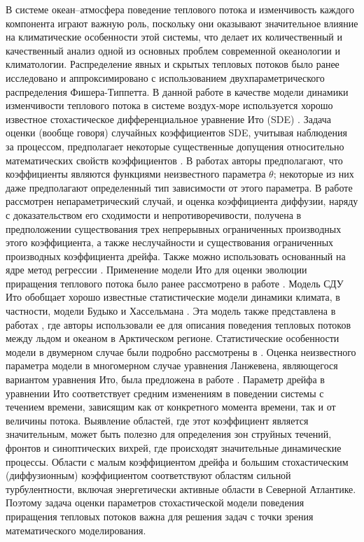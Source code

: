 В системе океан–атмосфера поведение теплового потока и изменчивость каждого компонента играют важную роль, поскольку они оказывают значительное влияние \cite{perry1977ocean} на климатические особенности этой системы, что делает их количественный и качественный анализ одной из основных проблем современной океанологии и климатологии. Распределение явных и скрытых тепловых потоков было ранее исследовано и аппроксимировано с использованием двухпараметрического распределения Фишера-Типпетта.
В данной работе в качестве модели динамики изменчивости теплового потока в системе воздух-море используется хорошо известное стохастическое дифференциальное уравнение Ито (SDE) \cite{Pascucci2022}. Задача оценки (вообще говоря) случайных коэффициентов SDE, учитывая наблюдения за процессом, предполагает некоторые существенные допущения относительно математических свойств коэффициентов \cite{Yoshida1992, GenonCatalot1993, GenonCatalot1994, Wei2016}. В работах \cite{Yoshida1992, GenonCatalot1993, GenonCatalot1994, Wei2016} авторы предполагают, что коэффициенты являются функциями неизвестного параметра $\theta$; некоторые из них даже предполагают определенный тип зависимости от этого параметра. В работе \cite{FlorensZmirou1993} рассмотрен непараметрический случай, и оценка коэффициента диффузии, наряду с доказательством его сходимости и непротиворечивости, получена в предположении существования трех непрерывных ограниченных производных этого коэффициента, а также неслучайности и существования ограниченных производных коэффициента дрейфа. Также можно использовать основанный на ядре метод регрессии \cite{Lamouroux2009}.
Применение модели Ито для оценки эволюции приращения теплового потока было ранее рассмотрено в работе \cite{Belyaev2021}. Модель СДУ Ито обобщает хорошо известные статистические модели динамики климата, в частности, модели Будыко \cite{Budyko1974} и Хассельмана \cite{Hasselmann1976}. Эта модель также представлена в работах \cite{van2021characterisation, toppaladoddi2021stochastic}, где авторы использовали ее для описания поведения тепловых потоков между льдом и океаном в Арктическом регионе. Статистические особенности модели в двумерном случае были подробно рассмотрены в \cite{Pascucci2022}. Оценка неизвестного параметра модели в многомерном случае уравнения Ланжевена, являющегося вариантом уравнения Ито, была предложена в работе \cite{Voutilainen2022}.
Параметр дрейфа в уравнении Ито соответствует средним изменениям в поведении системы с течением времени, зависящим как от конкретного момента времени, так и от величины потока. Выявление областей, где этот коэффициент является значительным, может быть полезно для определения зон струйных течений, фронтов и синоптических вихрей, где происходят значительные динамические процессы. Области с малым коэффициентом дрейфа и большим стохастическим (диффузионным) коэффициентом соответствуют областям сильной турбулентности, включая энергетически активные области в Северной Атлантике. Поэтому задача оценки параметров стохастической модели поведения приращения тепловых потоков важна для решения задач с точки зрения математического моделирования.
